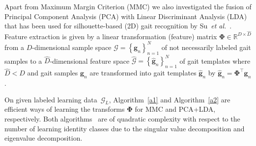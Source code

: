 \documentclass[10pt,a4paper]{llncs}
\newcommand{\gD}{\ensuremath{D}} %
\newcommand{\gG}{\ensuremath{\mathcal{G}}} %
\newcommand{\gGn}[1]{\ensuremath{\gB{g}_{#1}}} %
\newcommand{\gGnH}[1]{\ensuremath{\gH{\gB{g}}_{#1}}} %
\newcommand{\gN}{\ensuremath{N}} %
\newcommand{\gPHI}{\ensuremath{\gB{\Phi}}} %
\newcommand{\gB}[1]{\ensuremath{\mathbf{#1}}} %
\newcommand{\gH}[1]{\ensuremath{\widehat{#1}}} %
\newcommand{\gL}[1]{\ensuremath{{#1}_L}} %
\newcommand\etal{\textit{et al.}\xspace}
\begin{document}
Apart from Maximum Margin Criterion (MMC) we also investigated the fusion of Principal Component Analysis (PCA) with Linear Discriminant Analysis (LDA) that has been used for silhouette-based (2D) gait recognition by Su~\etal~\cite{SLC09}. Feature extraction is given by a linear transformation (feature) matrix $\gPHI\in\mathbb{R}^{\gD\times\gH{\gD}}$ from a \hbox{$\gD$-dimensional} sample space $\gG=\left\{\gGn{n}\right\}_{n=1}^{\gN}$ of not necessarily labeled gait samples to a $\gH{\gD}$-dimensional feature space $\gH{\gG}=\left\{\gGnH{n}\right\}_{n=1}^{\gN}$ of gait templates where $\gH{\gD}<\gD$ and gait samples $\gGn{n}$ are transformed into gait templates $\gGnH{n}$ by $\gGnH{n}=\gPHI^\top\gGn{n}$.

On given labeled learning data~$\gL{\gG}$, Algorithm~\ref{a1} and Algorithm~\ref{a2} are efficient ways of learning the transforms $\gPHI$ for MMC and PCA+LDA, respectively. Both algorithms~\cite{BS16a,BS16b} are of quadratic complexity with respect to the number of learning identity classes due to the singular value decomposition and eigenvalue decomposition.
\end{document}
